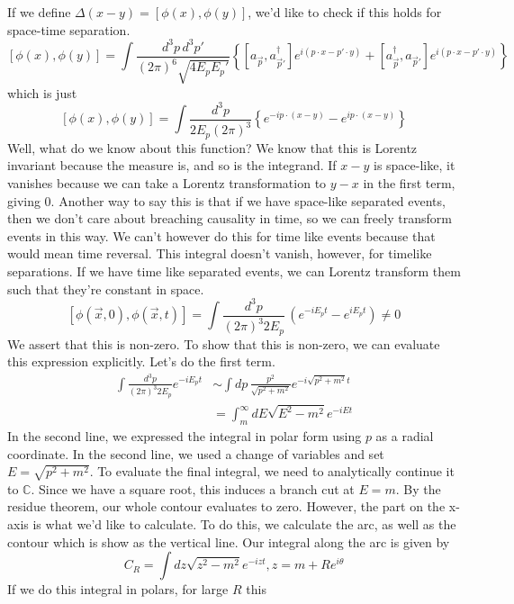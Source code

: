 If we define $ \Delta( x -y )  = [ \phi ( x), \phi ( y ) ] $, we'd like to check if this holds for space-time separation.  
\[ [ \phi ( x), \phi ( y ) ]  = 
\int \frac{d^{ 3 } p \, d^ 3 p' }{ ( 2 \pi )^6 \sqrt{ 4 E_p E_p' } } \left\{ [a_{\vec{p}}, a_{\vec{p}'}^\dagger ] e^{ i ( p \cdot  x  - p' \cdot  y) } + [ a_{\vec{p}}^\dagger , a_{\vec{p}'} ] e^{ i ( p \cdot  x - p ' \cdot  y) }   \right\} 
\] which is just 
\[ [ \phi ( x) , \phi ( y ) ] 
= \int \frac{ d^3 p }{ 2 E_p ( 2 \pi )^3 } \left\{ e^{  - i p \cdot  ( x - y ) } - e^{ i p \cdot  ( x - y ) } \right\} 
\] Well, what do we know about this function? 
We know that this is Lorentz invariant because the measure is, and so is the 
integrand. 
If  $ x - y $ is space-like, it vanishes because we can take
a Lorentz transformation to $ y - x$ in the first term, 
giving 0. Another way to say this is that if we have space-like separated events, 
then we don't care about breaching causality in time, so we can freely 
transform events in this way. We can't however do this for 
time like events because that would mean time reversal. 
This integral doesn't vanish, however, 
for timelike separations. If we have time like separated events, we 
can Lorentz transform them such that they're constant in space. 
\[
[ \phi ( \vec{x}, 0 ) , \phi ( \vec{x}, t ) ] = \int \frac{d^3 p }{ ( 2\pi ) ^3 2 E_p }\, ( e^{  - i E_p t }  - e^{ i E_p t } ) \neq 0 
\]
We assert that this is non-zero.
To show that this is non-zero, we can evaluate this expression explicitly. Let's do the 
first term. 
\begin{align*}
\int \frac{d^ 3 p }{( 2 \pi )^  3 2E_p }e^{  - i E_p t } & \sim \int dp \, \frac{p^ 2 }{ \sqrt{ p ^2 + m^2 }  }e^{  -i \sqrt{ p^2 + m^ 2 }  t} \\
& = \int_m^\infty dE \sqrt{ E^2  - m^ 2 } e^{  - i E t }
\end{align*}
In the second line, we expressed the integral  in polar form using $ p $ as a radial coordinate. 
In the second line, we used a change of variables and 
set $ E = \sqrt{ p^ 2 + m^2 } $. To evaluate the final integral, 
we need to analytically continue it to $ \mathbb{ C} $. 
Since we have a square root, this induces a branch cut at 
$ E = m $. By the residue theorem, our whole contour evaluates to zero. 
However, the part on the x-axis is what we'd like to calculate. 
To do this, we calculate the arc, as well as the contour which is show as the vertical line. 
Our integral along the arc is given by 
\[
C_R  = 	\int dz \sqrt{ z^2  - m^2 }  e^{ - i z t }, z = m + Re^{ i \theta }  
\] If we do this integral in polars, for large $ R $ this 
